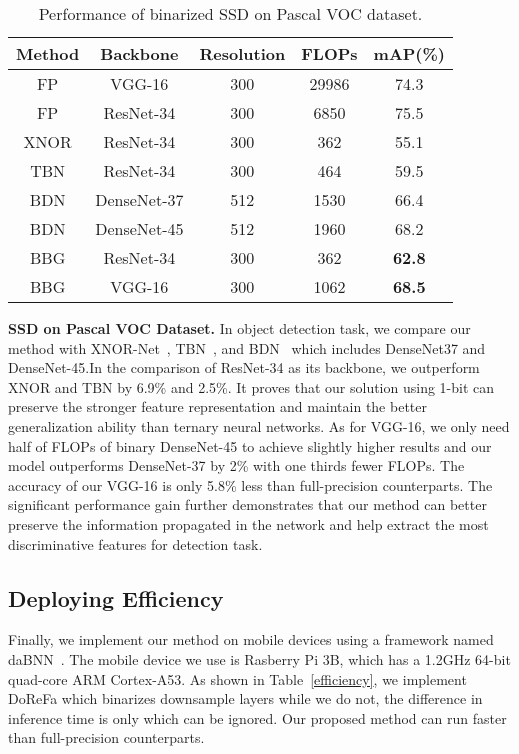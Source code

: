 \documentclass{article}
\begin{document}
\begin{table}[h]
	\vspace{-0.2in}
	\centering
	\small
	\caption{Performance of binarized SSD on Pascal VOC dataset.}
	\vspace{0.3em}
	\renewcommand\arraystretch{1.0}
	\begin{tabular}{|c||c|c|c|c|}
		\hline
		Method&Backbone&Resolution&FLOPs&mAP(\%)\\
		\hline\hline
		FP&VGG-16&300&29986&74.3\\
		FP&ResNet-34&300&6850&75.5\\
		\hline
		XNOR&ResNet-34&300&362&55.1\\
		TBN&ResNet-34&300&464&59.5\\	
		BDN&DenseNet-37&512&1530&66.4\\
		BDN&DenseNet-45&512&1960&68.2\\
		\hline
		BBG&ResNet-34&300&362&\textbf{62.8}\\
		BBG&VGG-16&300&1062&\textbf{68.5}\\
		\hline
	\end{tabular}
\label{ssd}\vspace{-0.2in}
\end{table}

\textbf{SSD on Pascal VOC Dataset.}
In object detection task, we compare our method with XNOR-Net~\cite{rastegari2016xnor}, TBN~\cite{wan2018tbn}, and BDN~\cite{bethge2019back} which includes DenseNet37 and DenseNet-45.In the comparison of ResNet-34 as its backbone, we outperform XNOR and TBN by 6.9\% and 2.5\%. It proves that our solution using 1-bit can preserve the stronger feature representation and maintain the better generalization ability than ternary neural networks. As for VGG-16, we only need half of FLOPs of binary DenseNet-45 to achieve slightly higher results and our model outperforms DenseNet-37 by 2\% with one thirds fewer FLOPs. The accuracy of our VGG-16 is only 5.8\% less than full-precision counterparts. The significant performance gain further demonstrates that our method can better preserve the information propagated in the network and help extract the most discriminative features for detection task. 


\subsection{Deploying Efficiency}
Finally, we implement our method on mobile devices using a framework named daBNN~\cite{zhang2019dabnn}. The mobile device we use is Rasberry Pi 3B, which has a 1.2GHz 64-bit quad-core ARM Cortex-A53. As shown in Table~\ref{efficiency}, we implement DoReFa which binarizes downsample layers while we do not, the difference in inference time is only  which can be ignored. Our proposed method can run  faster than full-precision counterparts.
\end{document}
